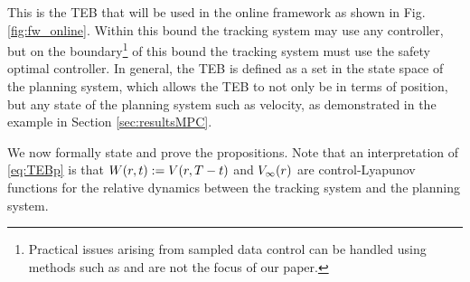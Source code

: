 This is the TEB that will be used in the online framework as shown in Fig. \ref{fig:fw_online}. 
Within this bound the tracking system may use any controller, but on the boundary\footnote{Practical issues arising from sampled data control can be handled using methods such as \cite{Mitchell2012, Mitchell13, Dabadie2014} and are not the focus of our paper.} of this bound the tracking system must use the safety optimal controller.
In general, the TEB is defined as a set in the state space of the planning system, which allows the TEB to not only be in terms of position, but any state of the planning system such as velocity, as demonstrated in the example in Section \ref{sec:resultsMPC}.

We now formally state and prove the propositions. Note that an interpretation of \eqref{eq:TEBp} is that $W(r, t) := V(r, T - t)$ and $V_\infty(r)$ are control-Lyapunov functions for the relative dynamics between the tracking system and the planning system.


